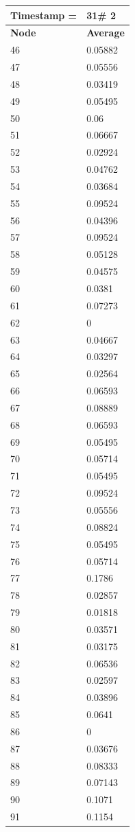 \begin{tabular}{|l||l|}
\hline
\textbf{Timestamp =} & \textbf{31}\# 2\\\hline
	\textbf{Node} & \textbf{Average} \\ \hline
\hline
	46 & 0.05882 \\ \hline
	47 & 0.05556 \\ \hline
	48 & 0.03419 \\ \hline
	49 & 0.05495 \\ \hline
	50 & 0.06 \\ \hline
	51 & 0.06667 \\ \hline
	52 & 0.02924 \\ \hline
	53 & 0.04762 \\ \hline
	54 & 0.03684 \\ \hline
	55 & 0.09524 \\ \hline
	56 & 0.04396 \\ \hline
	57 & 0.09524 \\ \hline
	58 & 0.05128 \\ \hline
	59 & 0.04575 \\ \hline
	60 & 0.0381 \\ \hline
	61 & 0.07273 \\ \hline
	62 & 0 \\ \hline
	63 & 0.04667 \\ \hline
	64 & 0.03297 \\ \hline
	65 & 0.02564 \\ \hline
	66 & 0.06593 \\ \hline
	67 & 0.08889 \\ \hline
	68 & 0.06593 \\ \hline
	69 & 0.05495 \\ \hline
	70 & 0.05714 \\ \hline
	71 & 0.05495 \\ \hline
	72 & 0.09524 \\ \hline
	73 & 0.05556 \\ \hline
	74 & 0.08824 \\ \hline
	75 & 0.05495 \\ \hline
	76 & 0.05714 \\ \hline
	77 & 0.1786 \\ \hline
	78 & 0.02857 \\ \hline
	79 & 0.01818 \\ \hline
	80 & 0.03571 \\ \hline
	81 & 0.03175 \\ \hline
	82 & 0.06536 \\ \hline
	83 & 0.02597 \\ \hline
	84 & 0.03896 \\ \hline
	85 & 0.0641 \\ \hline
	86 & 0 \\ \hline
	87 & 0.03676 \\ \hline
	88 & 0.08333 \\ \hline
	89 & 0.07143 \\ \hline
	90 & 0.1071 \\ \hline
	91 & 0.1154 \\ \hline
\end{tabular}
